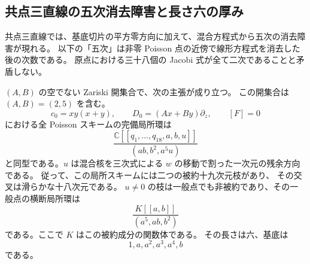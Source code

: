 \subsection{共点三直線の五次消去障害と長さ六の厚み}
\label{subsec:concurrent-mixed-v32}

共点三直線では、基底切片の平方零方向に加えて、混合方程式から五次の消去障害が現れる。
以下の「五次」は非零 Poisson 点の近傍で線形方程式を消去した後の次数である。
原点における三十八個の Jacobi 式が全て二次であることと矛盾しない。

\begin{theorem}[共点三直線の全形式局所模型]
\label{thm:concurrent-mixed-v32}
$(A,B)$ の空でない Zariski 開集合で、次の主張が成り立つ。
この開集合は $(A,B)=(2,5)$ を含む。
\[
 c_0=xy(x+y),\qquad D_0=(Ax+By)\partial_z,\qquad [F]=0
\]
における全 Poisson スキームの完備局所環は
\[
 \boxed{
 \frac{\mathbb C[[q_1,\ldots,q_{18},a,b,u]]}
 {(ab,b^2,a^5u)}
 }
\]
と同型である。$u$ は混合核を三次式による $w$ の移動で割った一次元の残余方向である。
従って、この局所スキームには二つの被約十九次元枝があり、
その交叉は滑らかな十八次元である。
$u\ne0$ の枝は一般点でも非被約であり、その一般点の横断局所環は
\[
 \frac{K[[a,b]]}{(a^5,ab,b^2)}
\]
である。ここで $K$ はこの被約成分の関数体である。
その長さは六、基底は
\[
 1,a,a^2,a^3,a^4,b
\]
である。
\end{theorem}

